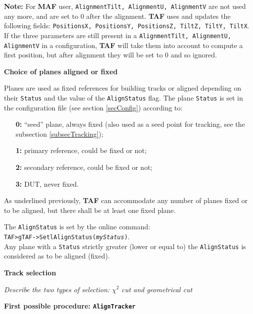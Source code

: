 \documentclass[a4paper, 12pt, twoside]{article}
\newcommand{\TAF}{{\bf TAF }}
\newcommand{\MAF}{{\bf MAF }}
\begin{document}
\noindent
{\bf Note:} For \MAF user,  {\tt AlignmentTilt, AlignmentU, AlignmentV} are not used any more, and are set to $0$ after the alignment. \TAF uses and updates the following fields: {\tt PositionsX, PositionsY, PositionsZ, TiltZ, TiltY, TiltX}. If the three parameters are still present in a {\tt AlignmentTilt, AlignmentU, AlignmentV} in a configuration, \TAF will take them into account to compute a first position, but after alignment they will be set to $0$ and so ignored.\\

\vspace{0.8 cm}

\noindent
{\bf Choice of planes aligned or fixed}

\noindent
Planes are used as fixed references for building tracks or aligned depending on their {\tt Status} and the value of the {\tt AlignStatus} flag. The plane {\tt Status} is set in the configuration file (see section \ref{secConfig}) according to:
\begin{itemize}
\item[{\bf 0:}] ``seed'' plane, always fixed (also used as a seed point for tracking, see the subsection \ref{subsecTracking});
\item[{\bf 1:}]  primary reference, could be fixed or not;
\item[{\bf 2:}]  secondary reference, could be fixed or not;
\item[{\bf 3:}]  DUT, never fixed.
\end{itemize}
As underlined previously, \TAF  can accommodate any number of planes fixed or to be aligned, but there shall be at least one fixed plane.

\noindent
The {\tt AlignStatus} is set by the online command:\\
{\tt TAF>gTAF->SetlAlignStatus({\it myStatus})}.\\
Any plane with a {\tt Status} strictly greater (lower or equal to) the {\tt AlignStatus} is considered as to be aligned (fixed).


\vspace{0.8 cm}

\noindent
{\bf Track selection}

{\it Describe the two types of selection: $\chi^{2}$ cut and geometrical cut}
 

\noindent\vspace{0.8 cm}

\noindent
{\bf First possible procedure: {\tt AlignTracker}}
\end{document}
